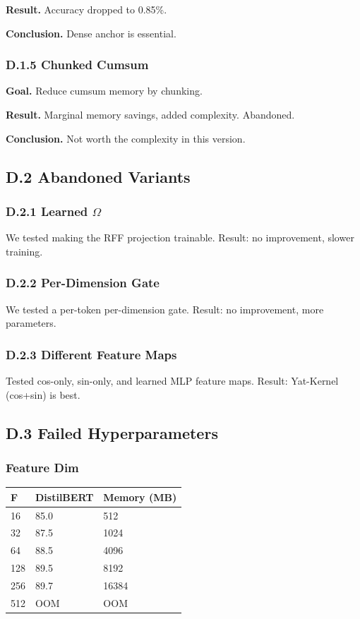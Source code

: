 \textbf{Result.} Accuracy dropped to 0.85\%.

\textbf{Conclusion.} Dense anchor is essential.

\subsubsection{D.1.5 Chunked Cumsum}

\textbf{Goal.} Reduce cumsum memory by chunking.

\textbf{Result.} Marginal memory savings, added complexity. Abandoned.

\textbf{Conclusion.} Not worth the complexity in this version.

\subsection{D.2 Abandoned Variants}

\subsubsection{D.2.1 Learned $\Omega$}

We tested making the RFF projection trainable. Result: no improvement, 
slower training.

\subsubsection{D.2.2 Per-Dimension Gate}

We tested a per-token per-dimension gate. Result: no improvement, more 
parameters.

\subsubsection{D.2.3 Different Feature Maps}

Tested cos-only, sin-only, and learned MLP feature maps. Result: 
Yat-Kernel (cos+sin) is best.

\subsection{D.3 Failed Hyperparameters}

\subsubsection{Feature Dim}

\begin{table}[H]
\centering
\small
\begin{tabular}{lll}
\toprule
\textbf{F} & \textbf{DistilBERT} & \textbf{Memory (MB)} \\
\midrule
16 & 85.0 & 512 \\
32 & 87.5 & 1024 \\
64 & 88.5 & 4096 \\
128 & 89.5 & 8192 \\
256 & 89.7 & 16384 \\
512 & OOM & OOM \\
\bottomrule
\end{tabular}
\end{table}

